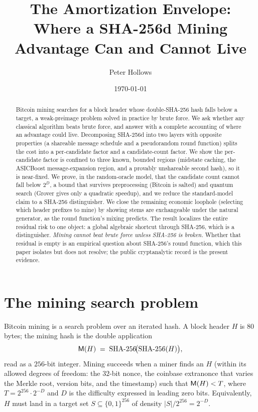 \documentclass[11pt]{article}
\title{\textbf{The Amortization Envelope:\\
Where a SHA-256d Mining Advantage Can and Cannot Live}}
\author{Peter Hollows}
\date{\today}
\begin{document}
\maketitle

\begin{abstract}
Bitcoin mining searches for a block header whose double-SHA-256 hash falls
below a target, a weak-preimage problem solved in practice by brute force.
We ask whether any classical algorithm beats brute force, and answer with a
complete accounting of where an advantage could live. Decomposing SHA-256d
into two layers with opposite properties (a shareable message schedule and
a pseudorandom round function) splits the cost into a per-candidate factor
and a candidate-count factor. We show the per-candidate factor is confined
to three known, bounded regions (midstate caching, the ASICBoost
message-expansion region, and a provably unshareable second hash), so it is
near-fixed. We prove, in the random-oracle model, that the candidate count
cannot fall below $2^{D}$, a bound that survives preprocessing (Bitcoin is
salted) and quantum search (Grover gives only a quadratic speedup), and we
reduce the standard-model claim to a SHA-256 distinguisher. We close the
remaining economic loophole (selecting which header prefixes to mine) by
showing stems are exchangeable under the natural generator, as the round
function's mixing predicts. The result localizes the entire
residual risk to one object: a global algebraic shortcut through SHA-256,
which is a distinguisher. \emph{Mining cannot beat brute force unless
SHA-256 is broken.} Whether that residual is empty is an empirical
question about SHA-256's round function, which this paper isolates but does
not resolve; the public cryptanalytic record is the present evidence.
\end{abstract}

\section{The mining search problem}

Bitcoin mining is a search problem over an iterated hash. A block header
$H$ is $80$ bytes; the mining hash is the double application
\[
  \mathsf{M}(H) \;=\; \mathrm{SHA\text{-}256}\!\big(\mathrm{SHA\text{-}256}(H)\big),
\]
read as a $256$-bit integer. Mining succeeds when a miner finds an $H$
(within its allowed degrees of freedom: the $32$-bit nonce, the
coinbase extranonce that varies the Merkle root, version bits, and the
timestamp) such that $\mathsf{M}(H) < T$, where $T = 2^{256}\cdot 2^{-D}$
and $D$ is the difficulty expressed in leading zero bits. Equivalently,
$H$ must land in a target set $S \subseteq \{0,1\}^{256}$ of density
$|S|/2^{256} = 2^{-D}$.
\end{document}

